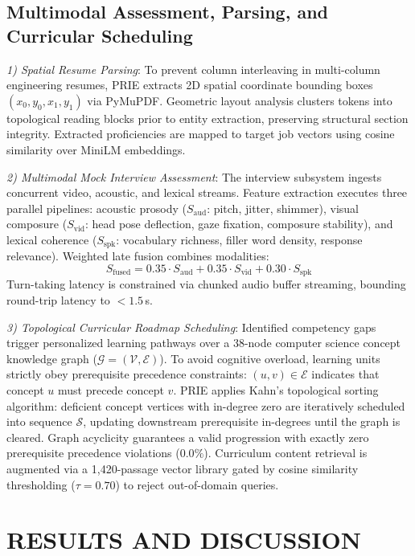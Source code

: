 \documentclass[conference]{IEEEtran}
\begin{document}
\subsection{Multimodal Assessment, Parsing, and Curricular Scheduling}
\textit{1) Spatial Resume Parsing}: To prevent column interleaving in multi-column engineering resumes, PRIE extracts 2D spatial coordinate bounding boxes $(x_0, y_0, x_1, y_1)$ via PyMuPDF. Geometric layout analysis clusters tokens into topological reading blocks prior to entity extraction, preserving structural section integrity. Extracted proficiencies are mapped to target job vectors using cosine similarity over MiniLM embeddings.

\textit{2) Multimodal Mock Interview Assessment}: The interview subsystem ingests concurrent video, acoustic, and lexical streams. Feature extraction executes three parallel pipelines: acoustic prosody ($S_{\text{aud}}$: pitch, jitter, shimmer), visual composure ($S_{\text{vid}}$: head pose deflection, gaze fixation, composure stability), and lexical coherence ($S_{\text{spk}}$: vocabulary richness, filler word density, response relevance). Weighted late fusion combines modalities:
\begin{equation}
S_{\text{fused}} = 0.35 \cdot S_{\text{aud}} + 0.35 \cdot S_{\text{vid}} + 0.30 \cdot S_{\text{spk}}
\label{eq_fusion}
\end{equation}
Turn-taking latency is constrained via chunked audio buffer streaming, bounding round-trip latency to $<1.5$\,s.

\textit{3) Topological Curricular Roadmap Scheduling}: Identified competency gaps trigger personalized learning pathways over a 38-node computer science concept knowledge graph ($\mathcal{G} = (\mathcal{V}, \mathcal{E})$). To avoid cognitive overload, learning units strictly obey prerequisite precedence constraints: $(u, v) \in \mathcal{E}$ indicates that concept $u$ must precede concept $v$. PRIE applies Kahn's topological sorting algorithm: deficient concept vertices with in-degree zero are iteratively scheduled into sequence $\mathcal{S}$, updating downstream prerequisite in-degrees until the graph is cleared. Graph acyclicity guarantees a valid progression with exactly zero prerequisite precedence violations ($0.0\%$). Curriculum content retrieval is augmented via a 1,420-passage vector library gated by cosine similarity thresholding ($\tau = 0.70$) to reject out-of-domain queries.

\section{RESULTS AND DISCUSSION}
\end{document}
